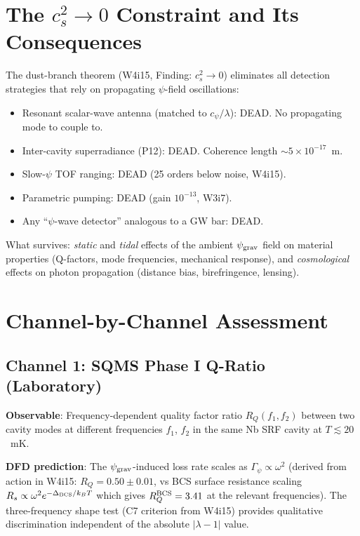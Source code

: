 \documentclass[11pt]{article}
\newcommand{\ee}[1]{\times 10^{#1}}
\begin{document}
\section{The $c_s^2 \to 0$ Constraint and Its Consequences}

The dust-branch theorem (W4i15, Finding: $c_s^2 \to 0$) eliminates all
detection strategies that rely on propagating $\psi$-field oscillations:

\begin{itemize}[nosep]
\item Resonant scalar-wave antenna (matched to $c_\psi/\lambda$): DEAD.
  No propagating mode to couple to.
\item Inter-cavity superradiance (P12): DEAD. Coherence length $\sim 5\ee{-17}$~m.
\item Slow-$\psi$ TOF ranging: DEAD (25 orders below noise, W4i15).
\item Parametric pumping: DEAD (gain $10^{-13}$, W3i7).
\item Any ``$\psi$-wave detector'' analogous to a GW bar: DEAD.
\end{itemize}

What survives: \emph{static} and \emph{tidal} effects of the ambient
$\psi_{\rm grav}$ field on material properties (Q-factors, mode frequencies,
mechanical response), and \emph{cosmological} effects on photon propagation
(distance bias, birefringence, lensing).

\section{Channel-by-Channel Assessment}

\subsection{Channel 1: SQMS Phase I Q-Ratio (Laboratory)}

\textbf{Observable}: Frequency-dependent quality factor ratio $R_Q(f_1, f_2)$
between two cavity modes at different frequencies $f_1$, $f_2$ in the same
Nb SRF cavity at $T \lesssim 20$~mK.

\textbf{DFD prediction}: The $\psi_{\rm grav}$-induced loss rate scales as
$\Gamma_\psi \propto \omega^2$ (derived from action in W4i15: $R_Q = 0.50
\pm 0.01$, vs BCS surface resistance scaling $R_s \propto \omega^2
e^{-\Delta_{\rm BCS}/k_B T}$ which gives $R_Q^{\rm BCS} = 3.41$ at the
relevant frequencies). The three-frequency shape test (C7 criterion from
W4i15) provides qualitative discrimination independent of the absolute
$|\lambda-1|$ value.
\end{document}
